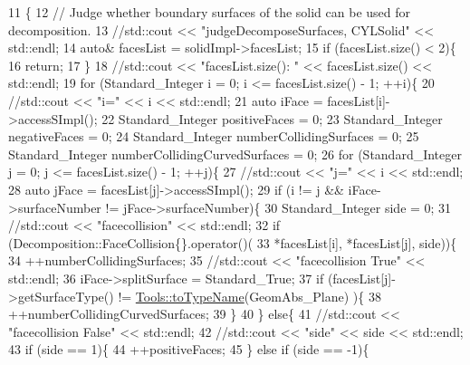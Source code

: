 \begin{DoxyCode}
11                                                                      \{
12     \textcolor{comment}{// Judge whether boundary surfaces of the solid can be used for decomposition.}
13     \textcolor{comment}{//std::cout << "judgeDecomposeSurfaces, CYLSolid" << std::endl;}
14     \textcolor{keyword}{auto}& facesList = solidImpl->facesList;
15     \textcolor{keywordflow}{if} (facesList.size() < 2)\{
16         \textcolor{keywordflow}{return};
17     \}
18     \textcolor{comment}{//std::cout << "facesList.size(): " << facesList.size() << std::endl;}
19     \textcolor{keywordflow}{for} (Standard\_Integer i = 0; i <= facesList.size() - 1; ++i)\{
20         \textcolor{comment}{//std::cout << "i=" << i << std::endl;}
21         \textcolor{keyword}{auto} iFace = facesList[i]->accessSImpl();
22         Standard\_Integer positiveFaces = 0;
23         Standard\_Integer negativeFaces = 0;
24         Standard\_Integer numberCollidingSurfaces = 0;
25         Standard\_Integer numberCollidingCurvedSurfaces = 0;
26         \textcolor{keywordflow}{for} (Standard\_Integer j = 0; j <= facesList.size() - 1; ++j)\{
27             \textcolor{comment}{//std::cout << "j=" << i << std::endl;}
28             \textcolor{keyword}{auto} jFace = facesList[j]->accessSImpl();
29             \textcolor{keywordflow}{if} (i != j && iFace->surfaceNumber != jFace->surfaceNumber)\{
30                 Standard\_Integer side = 0;
31                 \textcolor{comment}{//std::cout << "facecollision" << std::endl;}
32                 \textcolor{keywordflow}{if} (Decomposition::FaceCollision\{\}.operator()(
33                             *facesList[i], *facesList[j], side))\{
34                     ++numberCollidingSurfaces;
35                     \textcolor{comment}{//std::cout << "facecollision True" << std::endl;}
36                     iFace->splitSurface = Standard\_True;
37                     \textcolor{keywordflow}{if} (facesList[j]->getSurfaceType() != \hyperlink{namespaceMcCAD_1_1Tools_a2c3c43d2878c73f69424e7b32f87bb2b}{Tools::toTypeName}(GeomAbs\_Plane)
      )\{
38                         ++numberCollidingCurvedSurfaces;
39                     \}
40                 \} \textcolor{keywordflow}{else}\{
41                     \textcolor{comment}{//std::cout << "facecollision False" << std::endl;}
42                     \textcolor{comment}{//std::cout << "side" << side << std::endl;}
43                     \textcolor{keywordflow}{if} (side == 1)\{
44                         ++positiveFaces;
45                     \} \textcolor{keywordflow}{else} \textcolor{keywordflow}{if} (side == -1)\{

\end{DoxyCode}
